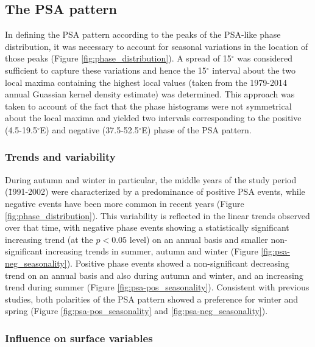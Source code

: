 \subsection{The PSA pattern}

In defining the PSA pattern according to the peaks of the PSA-like phase distribution, it was necessary to account for seasonal variations in the location of those peaks (Figure \ref{fig:phase_distribution}). A spread of 15$^{\circ}$ was considered sufficient to capture these variations and hence the 15$^{\circ}$ interval about the two local maxima containing the highest local values (taken from the 1979-2014 annual Guassian kernel density estimate) was determined. This approach was taken to account of the fact that the phase histograms were not symmetrical about the local maxima and yielded two intervals corresponding to the positive (4.5-19.5$^{\circ}$E) and negative (37.5-52.5$^{\circ}$E) phase of the PSA pattern.

\subsubsection{Trends and variability}

During autumn and winter in particular, the middle years of the study period (\~1991-2002) were characterized by a predominance of positive PSA events, while negative events have been more common in recent years (Figure \ref{fig:phase_distribution}). This variability is reflected in the linear trends observed over that time, with negative phase events showing a statistically significant increasing trend (at the $p < 0.05$ level) on an annual basis and smaller non-significant increasing trends in summer, autumn and winter (Figure \ref{fig:psa-neg_seasonality}). Positive phase events showed a non-significant decreasing trend on an annual basis and also during autumn and winter, and an increasing trend during summer (Figure \ref{fig:psa-pos_seasonality}). Consistent with previous studies, both polarities of the PSA pattern showed a preference for winter and spring (Figure \ref{fig:psa-pos_seasonality} and \ref{fig:psa-neg_seasonality}).

\subsubsection{Influence on surface variables} 

